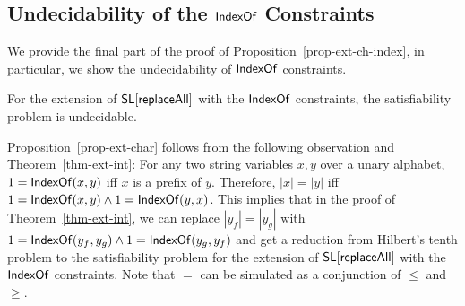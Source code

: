 %
%
%
%
 

\subsection{Undecidability of the $\mathsf{IndexOf}$ Constraints}

We provide the final part of the proof of Proposition~\ref{prop-ext-ch-index}, in particular, we show the undecidability of $\mathsf{IndexOf}$ constraints.

\begin{proposition}\label{prop-indexof}
	For the extension of $\mathsf{SL}[\mathsf{replaceAll}]$ with the $\mathsf{IndexOf}$ constraints, the satisfiability problem is undecidable. 
\end{proposition}

Proposition~\ref{prop-ext-char} follows from the following observation and Theorem~\ref{thm-ext-int}: For any two string variables $x,y$ over a unary alphabet, 
$1= \mathsf{IndexOf}(x,y)$ iff $x$ is a prefix of $y$. Therefore, $|x| = |y|$ iff $1=  \mathsf{IndexOf}(x,y) \wedge 1= \mathsf{IndexOf}(y,x)$. This implies that in the proof of Theorem~\ref{thm-ext-int}, we can replace $|y_f| = |y_g|$ with $1=\mathsf{IndexOf}(y_f, y_g) \wedge 1 = \mathsf{IndexOf}(y_g, y_f)$ and get a reduction from Hilbert's tenth problem to the satisfiability problem for the extension of $\mathsf{SL}[\mathsf{replaceAll}]$ with the $\mathsf{IndexOf}$ constraints.
Note that $=$ can be simulated as a conjunction of $\leq$ and $\geq$.
 



